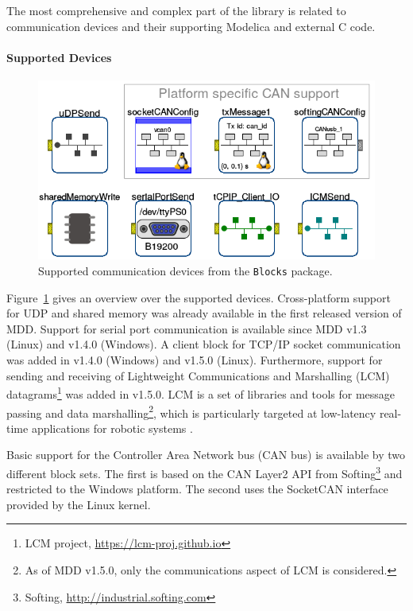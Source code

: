\documentclass{resources/modelica}
\newcommand{\modelica}[1]{\lstinline[language=modelica]|#1|}
\begin{document}
The most comprehensive and complex part of the library is related to
communication devices and their supporting Modelica and external C code.

\paragraph{Supported Devices}

\begin{figure}[htb]
  \centering
  \includegraphics[width=0.9\columnwidth]{figures/OverviewCommunicationDevices}
  \caption{Supported communication devices from the \modelica{Blocks} package.}
  \label{fig:OverviewCommunicationDevices}
\end{figure}


Figure~\ref{fig:OverviewCommunicationDevices} gives an overview over the
supported devices. Cross-platform support for UDP and shared memory was already
available in the first released version of MDD. Support for serial port communication is
available since MDD v1.3 (Linux) and v1.4.0 (Windows). A client block for TCP/IP
socket communication was added in v1.4.0 (Windows) and v1.5.0 (Linux).
Furthermore, support for sending and receiving of Lightweight Communications and
Marshalling (LCM) datagrams\footnote{LCM project,
\url{https://lcm-proj.github.io}} was added in v1.5.0.
LCM is a set of libraries and tools for message passing and data marshalling\footnote{As of MDD
v1.5.0, only the communications aspect of LCM is considered.},
which is particularly targeted at low-latency real-time applications for
robotic systems \citep{Huang2010}.

Basic support for the Controller Area Network bus (CAN bus) is available by two
different block sets. The first is based on the CAN Layer2 API from
Softing\footnote{Softing, \url{http://industrial.softing.com}} and restricted to the
Windows platform. The second uses the SocketCAN
interface provided by the Linux kernel.
\end{document}
